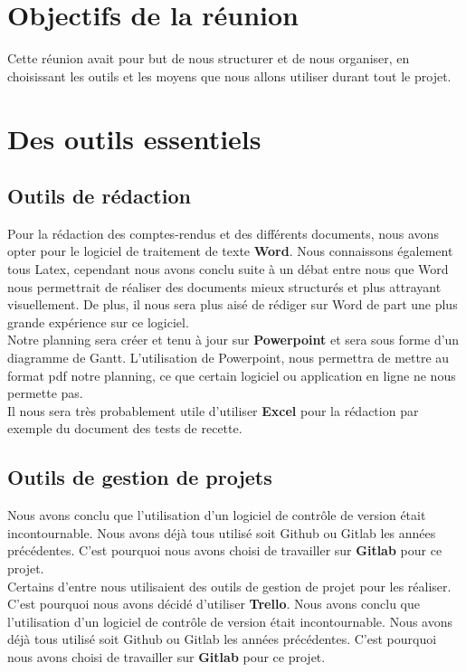\documentclass[a4paper, 12pt]{article}
\begin{document}
\section{Objectifs de la réunion}
Cette réunion avait pour but de nous structurer et de nous organiser, en choisissant les outils et les moyens que nous allons utiliser durant tout le projet. 

\section{Des outils essentiels}

\subsection{Outils de rédaction}
Pour la rédaction des comptes-rendus et des différents documents, nous avons opter pour le logiciel de traitement de texte  \textbf{Word}. Nous connaissons également tous Latex, cependant nous avons conclu suite à un débat entre nous que Word nous permettrait de réaliser des documents  mieux structurés et plus attrayant visuellement. De plus, il nous sera plus aisé de rédiger sur Word de part une plus grande expérience sur ce logiciel.\\


Notre planning sera créer et tenu à jour sur \textbf{Powerpoint} et sera sous forme d'un diagramme de Gantt.
L'utilisation de Powerpoint, nous permettra de mettre au format pdf notre planning, ce que certain logiciel ou application en ligne ne nous permette pas.  \\

Il nous sera très probablement utile d'utiliser \textbf{Excel} pour la rédaction par exemple du document des tests de recette. \\

\subsection{Outils de gestion de projets}
Nous avons conclu que l'utilisation d'un logiciel de contrôle de version était incontournable. Nous avons déjà tous utilisé soit Github ou Gitlab les années précédentes. C'est pourquoi nous avons choisi de travailler sur \textbf{Gitlab} pour ce projet. \\

Certains d'entre nous utilisaient des outils de gestion de projet pour les réaliser. C'est pourquoi nous avons décidé d'utiliser \textbf{Trello}. Nous avons conclu que l'utilisation d'un logiciel de contrôle de version était incontournable. Nous avons déjà tous utilisé soit Github ou Gitlab les années précédentes. C'est pourquoi nous avons choisi de travailler sur \textbf{Gitlab} pour ce projet. \\
\end{document}
